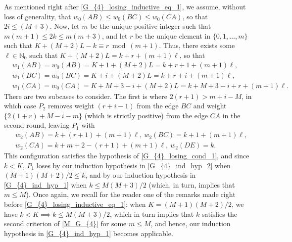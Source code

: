 \documentclass[11pt,reqno]{amsart}
\theoremstyle{definition}
\theoremstyle{definition}
\begin{document}
\begin{enumerate}
As mentioned right after \eqref{G_{4}_losing_inductive_eq_1}, we assume, without loss of generality, that $w_{0}(AB)\leqslant w_{0}(BC)\leqslant w_{0}(CA)$, so that $2i \leqslant (M+3)$. Now, let $m$ be the unique positive integer such that $m(m+1) \leqslant 2k \leqslant m(m+3)$, and let $r$ be the unique element in $\{0,1,\ldots,m\}$ such that $K+(M+2)L-k \equiv r \bmod (m+1)$. Thus, there exists some $\ell \in \mathbb{N}_{0}$ such that $K+(M+2)L=k+r+(m+1)\ell$, so that
\begin{align}
{}&w_{1}(AB)=w_{0}(AB)=K+1+(M+2)L=k+r+1+(m+1)\ell,\nonumber\\
{}&w_{1}(BC)=w_{0}(BC)=K+i+(M+2)L=k+r+i+(m+1)\ell,\nonumber\\
{}&w_{1}(CA)=w_{0}(CA)=K+M+3-i+(M+2)L=k+M+3-i+r+(m+1)\ell.\nonumber
\end{align}
There are two subcases to consider. The first is where $2(r+1) > m+i-M$, in which case $P_{2}$ removes weight $(r+i-1)$ from the edge $BC$ and weight $\{2(1+r)+M-i-m\}$ (which is strictly positive) from the edge $CA$ in the second round, leaving $P_{1}$ with
\begin{align}
{}&w_{2}(AB)=k+(r+1)+(m+1)\ell,\ w_{2}(BC)=k+1+(m+1)\ell,\nonumber\\
{}&w_{2}(CA)=k+m+2-(r+1)+(m+1)\ell,\ w_{2}(DE)=k.\nonumber
\end{align}
This configuration satisfies the hypothesis of \eqref{G_{4}_losing_cond_1}, and since $k < K$, $P_{1}$ loses by our induction hypothesis in \eqref{G_{4}_ind_hyp_2} when $(M+1)(M+2)/2 \leqslant k$, and by our induction hypothesis in \eqref{G_{4}_ind_hyp_1} when $k \leqslant M(M+3)/2$ (which, in turn, implies that $m \leqslant M$). Once again, we recall for the reader one of the remarks made right before \eqref{G_{4}_losing_inductive_eq_1}: when $K=(M+1)(M+2)/2$, we have $k < K \implies k \leqslant M(M+3)/2$, which in turn implies that $k$ satisfies the second criterion of \eqref{M_G_{4}} for some $m \leqslant M$, and hence, our induction hypothesis in \eqref{G_{4}_ind_hyp_1} becomes applicable.


\end{enumerate}
\end{document}
